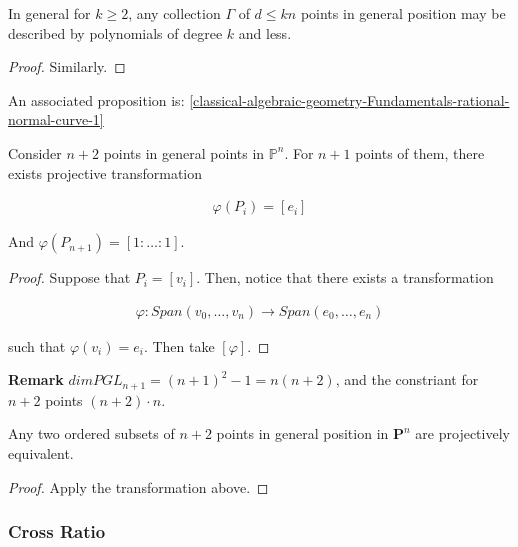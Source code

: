 \documentclass[Total.tex]{subfiles}
\begin{document}
			
			
			
			\begin{theorem}
				In general for $k\geq 2$, any collection $\Gamma$ of $d\leq kn$ points in general position may be described by polynomials of degree $k$ and less.
			\end{theorem}
			
			\begin{proof}
				Similarly. 
			\end{proof}
			
			
			An associated proposition is: \ref{classical-algebraic-geometry-Fundamentals-rational-normal-curve-1}
			
			\begin{lemma}
				Consider $n+2$ points in general points in $\mathbb{P}^n$. For $n+1$ points of them, there exists projective transformation
				
				\begin{gather*}
					\varphi(P_i)=[e_i]
				\end{gather*}
				
				And $\varphi(P_{n+1})=[1:\dots:1]$.
						
			\end{lemma}
			
			\begin{proof}
				Suppose that $P_i=[v_i]$. Then, notice that there exists a transformation
				
				\begin{gather*}
					\varphi:Span(v_0,\dots,v_n)\rightarrow Span(e_0,\dots,e_n)
				\end{gather*}
				
				such that $\varphi(v_i)=e_i$. Then take $[\varphi]$. 
			\end{proof}
			
			\textbf{Remark} $dimPGL_{n+1}=(n+1)^2-1=n(n+2)$, and the constriant for $n+2$ points $(n+2)\cdot n$.
			
			\begin{theorem}
				Any two ordered subsets of $n+2$ points in general position in $\mathbf{P}^n$ are projectively equivalent.
			\end{theorem}
			
			\begin{proof}
				Apply the transformation above.
			\end{proof}
			
			\subsubsection{Cross Ratio}
			
\end{document}
